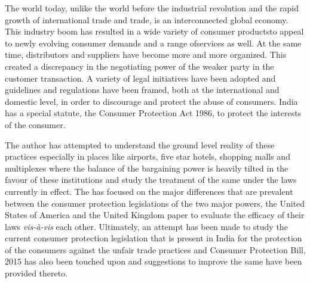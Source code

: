 \setcounter{figure}{0}
\setcounter{table}{0}


\begin{multicols}{2}


\vspace{.1cm}

\noi
The world today, unlike the world before the industrial revolution and the rapid growth of
international trade and trade, is an interconnected global economy. This industry boom has
resulted in a wide variety of consumer productsto appeal to newly evolving consumer demands
and a range ofservices as well. At the same time, distributors and suppliers have become more
and more organized. This created a discrepancy in the negotiating power of the weaker party
in the customer transaction. A variety of legal initiatives have been adopted and guidelines and
regulations have been framed, both at the international and domestic level, in order to
discourage and protect the abuse of consumers. India has a special statute, the Consumer
Protection Act 1986, to protect the interests of the consumer.

\vspace{.1cm}

\noi
The author has attempted to understand the ground level reality of these practices especially in
places like airports, five star hotels, shopping malls and multiplexes where the balance of the
bargaining power is heavily tilted in the favour of these institutions and study the treatment of
the same under the laws currently in effect. The has focused on the major differences that are
prevalent between the consumer protection legislations of the two major powers, the United
States of America and the United Kingdom paper to evaluate the efficacy of their laws \textit{vis-à-vis} each other. Ultimately, an attempt has been made to study the current consumer protection
legislation that is present in India for the protection of the consumers against the unfair trade
practices and Consumer Protection Bill, 2015 has also been touched upon and suggestions to
improve the same have been provided thereto.


\end{multicols}
